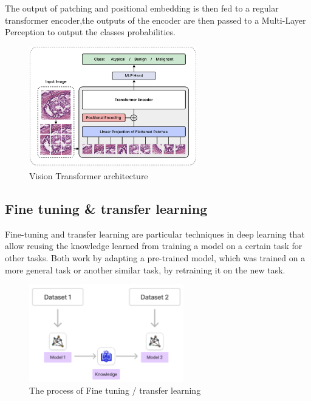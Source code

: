 \documentclass[
11pt, %
english, %
singlespacing, %
headsepline, %
]{project_structure}
\begin{document}
\noindent The output of patching and positional embedding is then fed to a regular transformer encoder,the outputs of the encoder are then passed to a Multi-Layer Perception to output the classes probabilities. 

\begin{figure}[H]
    \centering
    \includegraphics[width=0.65\textwidth]{figures/background/ViT.png}
    \caption{Vision Transformer architecture}
    \label{fig:vision-transformer}
\end{figure}

\subsection{Fine tuning \& transfer learning}

\noindent Fine-tuning and transfer learning are particular techniques in deep learning that allow reusing the knowledge learned from training a model on a certain task for other tasks. Both work by adapting a pre-trained model, which was trained on a more general task or another similar task, by retraining it on the new task.\\

\begin{figure}[H]
    \centering
    \includegraphics[width=0.6\textwidth]{figures/background/tl.png}
    \caption{The process of Fine tuning / transfer learning}
    \label{fig:transfer-learning-fine-tuning}
\end{figure}
\end{document}
